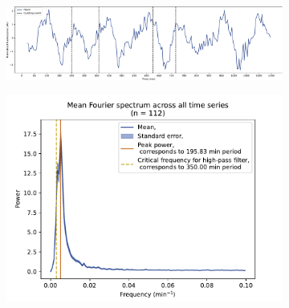 \begin{figure}
  \centering
  \begin{subfigure}[t]{1.0\textwidth}
   \centering
   \includegraphics[width=\textwidth]{409_zwf1egf_010-44-1_edit.pdf}
   \caption{
   }
   \label{fig:biology-zwf1-single}
  \end{subfigure}

  \begin{subfigure}[t]{0.45\textwidth}
   \centering
   \includegraphics[width=\textwidth]{zwf1egf_409_13.pdf}
   \caption{
   }
   \label{fig:biology-zwf1-fourier}
  \end{subfigure}%
  \begin{subfigure}[t]{0.45\textwidth}
   \centering

\end{subfigure}
\end{figure}
